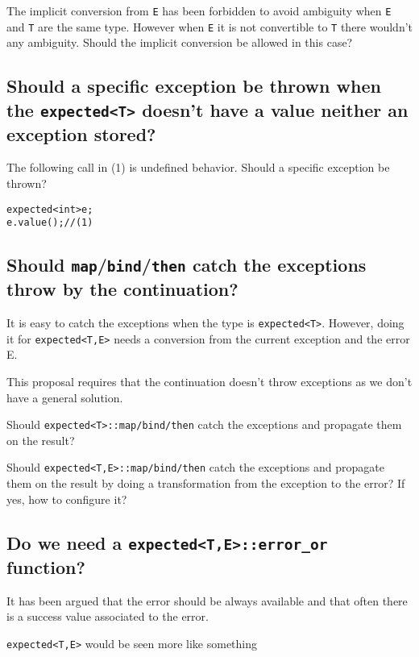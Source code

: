 \documentclass[a4paper,10pt]{article}
\newcommand{\cpp}[1]{\lstinline{#1}}
\begin{document}
The implicit conversion from \cpp{E} has been forbidden to avoid ambiguity when \cpp{E} and \cpp{T} are the same type. 
However when \cpp{E} it is not convertible to \cpp{T} there wouldn't any ambiguity. 
Should the implicit conversion be allowed in this case?

\subsection{Should a specific exception be thrown when the \cpp{expected<T>} doesn't have a value neither an exception stored?}

The following call in (1) is undefined behavior. Should a specific exception be thrown?

\begin{alltt}
expected<int> e;
e.value(); // (1)
\end{alltt}

\subsection{Should \cpp{map}/\cpp{bind}/\cpp{then} catch the exceptions throw by the continuation?}

It is easy to catch the exceptions when the type is \cpp{expected<T>}. However, doing it for \cpp{expected<T,E>} needs a conversion from the current exception and the error E.

This proposal requires that the continuation doesn't throw exceptions as we don't have a general solution.

Should  \cpp{expected<T>::map/bind/then} catch the exceptions and propagate them on the result?

Should  \cpp{expected<T,E>::map/bind/then} catch the exceptions and propagate them on the result by doing a transformation from the exception to the error? If yes, how to configure it?

\subsection{Do we need a \cpp{expected<T,E>::error_or} function?}

It has been argued that the error should be always available and that often there is a success value associated to the error.

\cpp{expected<T,E>} would be seen more like something  
\end{document}
